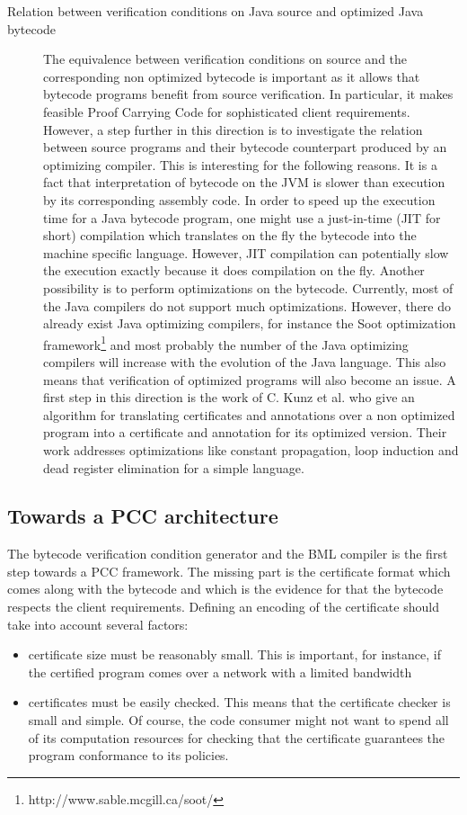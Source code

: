 \begin{description}
\item[Relation between verification conditions on Java source and optimized Java bytecode]
 The equivalence  between verification conditions on source and the corresponding non optimized bytecode is important as it
 allows that bytecode programs  benefit from source verification. In particular, it makes feasible Proof Carrying Code
 for sophisticated client requirements.
 However, a step further in this direction is to investigate the 
 relation between source programs and their bytecode counterpart produced by an optimizing compiler.
 This is interesting for the following reasons.
 It is a fact that interpretation of bytecode on the JVM is slower than execution by its corresponding assembly code. 
 In order to speed up the execution time for a Java bytecode program, one might use 
 a just-in-time (JIT for short) compilation which  translates on the fly the bytecode into the machine specific language. However, JIT compilation can potentially slow
 the execution exactly because it does compilation on the fly.  Another possibility is to perform 
 optimizations on the bytecode. Currently, most of the  Java compilers do not support much optimizations.
 However, there do already exist Java optimizing compilers, for instance the Soot optimization framework\footnote{http://www.sable.mcgill.ca/soot/} 
 and most probably the number of the Java optimizing compilers will increase with the evolution of the Java language.
 This also means that verification of optimized programs will also become an issue.
 A first step in this direction is the work of C. Kunz et al.\cite{BGKRsas06} who give an algorithm for translating 
 certificates and annotations over a non optimized program into a certificate  and annotation for its optimized version.
 Their work addresses  optimizations like constant propagation, loop induction and dead register elimination for a simple language.  
\end{description}
\subsection{Towards a PCC architecture}

The bytecode verification condition generator and the BML compiler is the first step towards a PCC framework. 
The missing  part is  the certificate format which comes along with the bytecode and which  is the evidence for 
that the bytecode respects the client requirements. Defining an encoding of the certificate should take into account several factors:
\begin{itemize} 
  \item certificate size must be reasonably small. This is important, for
  instance,  if the certified program comes over a network with a limited  bandwidth
  \item certificates must be easily checked. This means that the certificate checker is  small and simple.
               Of course, the code consumer might not want to spend all of its computation 
              resources for checking that the certificate guarantees the program conformance to its policies.     

\end{itemize}


